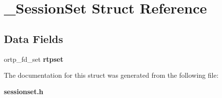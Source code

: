 \section{\+\_\+\+Session\+Set Struct Reference}
\label{struct__SessionSet}
\subsection*{Data Fields}
\begin{DoxyCompactItemize}
\item 
\mbox{\label{struct__SessionSet_ad67b4a3c57c723ce62decc9a37ba27de}} 
ortp\+\_\+fd\+\_\+set {\bfseries rtpset}
\end{DoxyCompactItemize}


The documentation for this struct was generated from the following file\+:\begin{DoxyCompactItemize}
\item 
\textbf{ sessionset.\+h}\end{DoxyCompactItemize}
